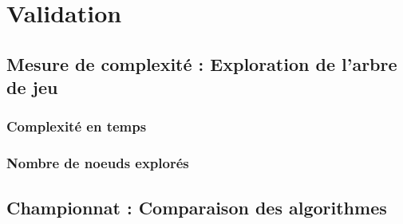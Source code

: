 \chapter{Validation}
\label{chap:validation}


\section{Mesure de complexité : Exploration de l'arbre de jeu}
\subsection{Complexité en temps}
\label{subsec:time_complexity}

\subsection{Nombre de noeuds explorés}
\label{subsec:node_explored}

\section{Championnat : Comparaison des algorithmes}
\label{sec:championship}

